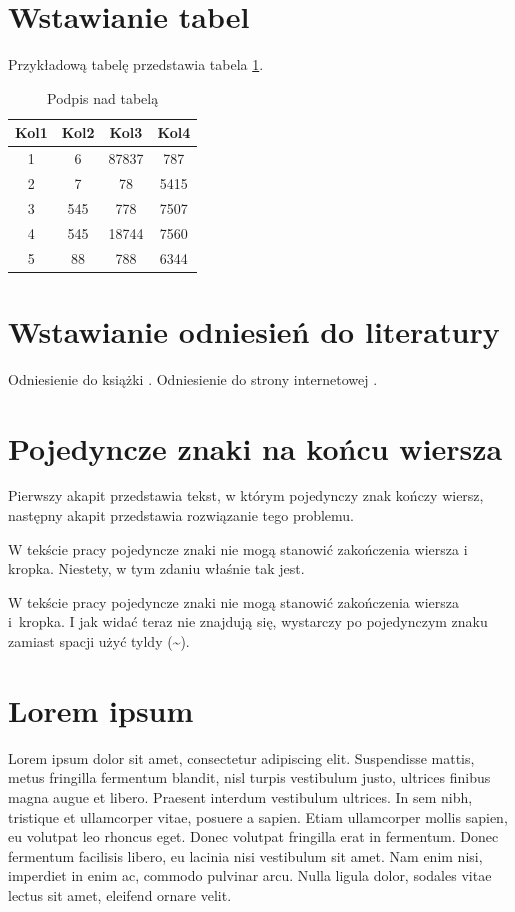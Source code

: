 \documentclass[a4paper,12pt,polish,twoside]{extreport}
\begin{document}
\section{Wstawianie tabel}
Przykładową tabelę przedstawia tabela \ref{example_table}.
 
\begin{table}[H]
\centering
\begin{tabular}{|c | c | c | c|} 
 \hline
 Kol1 & Kol2 & Kol3 & Kol4 \\
 \hline
 1 & 6 & 87837 & 787 \\
 2 & 7 & 78 & 5415 \\
 3 & 545 & 778 & 7507 \\
 4 & 545 & 18744 & 7560 \\
 5 & 88 & 788 & 6344 \\
 \hline
\end{tabular}
\caption[Podpis w spisie tabel]{Podpis nad tabelą}
\label{example_table}
\end{table}

\section{Wstawianie odniesień do literatury}
Odniesienie do książki \cite{example_book}. Odniesienie do strony internetowej \cite{example_website}.

\section{Pojedyncze znaki na końcu wiersza}
Pierwszy akapit przedstawia tekst, w którym pojedynczy znak kończy wiersz, następny akapit przedstawia rozwiązanie tego problemu.

W tekście pracy pojedyncze znaki nie mogą stanowić zakończenia wiersza i kropka. Niestety, w tym zdaniu właśnie tak jest.

W tekście pracy pojedyncze znaki nie mogą stanowić zakończenia wiersza i~kropka. I jak widać teraz nie znajdują się, wystarczy po pojedynczym znaku zamiast spacji użyć tyldy (\~{}).

\section{Lorem ipsum}
Lorem ipsum dolor sit amet, consectetur adipiscing elit. Suspendisse mattis, metus fringilla fermentum blandit, nisl turpis vestibulum justo, ultrices finibus magna augue et libero. Praesent interdum vestibulum ultrices. In sem nibh, tristique et ullamcorper vitae, posuere a sapien. Etiam ullamcorper mollis sapien, eu volutpat leo rhoncus eget. Donec volutpat fringilla erat in fermentum. Donec fermentum facilisis libero, eu lacinia nisi vestibulum sit amet. Nam enim nisi, imperdiet in enim ac, commodo pulvinar arcu. Nulla ligula dolor, sodales vitae lectus sit amet, eleifend ornare velit.
\end{document}
